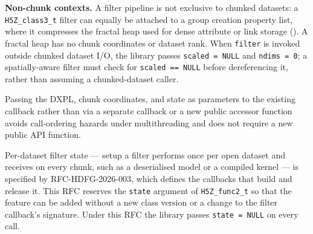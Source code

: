 \documentclass[../RFC-HDFG-2026-001.tex]{subfiles}
\begin{document}
\textbf{Non-chunk contexts.}  A filter pipeline is not exclusive to
chunked datasets: a \texttt{H5Z\_class3\_t} filter can equally be
attached to a group creation property list, where it compresses the
fractal heap used for dense attribute or link storage
().  A fractal heap has no chunk
coordinates or dataset rank.  When \texttt{filter} is invoked outside
chunked dataset I/O, the library passes \texttt{scaled~=~NULL} and
\texttt{ndims~=~0}; a spatially-aware filter must check for
\texttt{scaled~==~NULL} before dereferencing it, rather than assuming a
chunked-dataset caller.

\noindent Passing the DXPL, chunk coordinates, and state as parameters to
the existing callback rather than via a separate callback or a new public
accessor function avoids call-ordering hazards under multithreading
and does not require a new public API function.

\label{sec:filter-state}

Per-dataset filter state --- setup a filter performs once per open
dataset and receives on every chunk, such as a deserialised model or a
compiled kernel --- is specified by RFC-HDFG-2026-003, which defines the
callbacks that build and release it.  This RFC reserves the
\texttt{state} argument of \texttt{H5Z\_func2\_t} so that the feature can
be added without a new class version or a change to the filter
callback's signature.  Under this RFC the library passes
\texttt{state~=~NULL} on every call.

\end{document}
